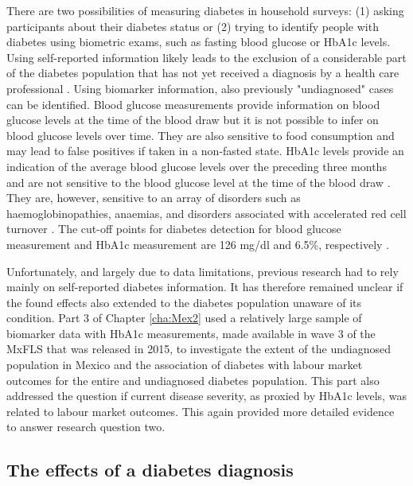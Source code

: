 There are two possibilities of measuring diabetes in household surveys: (1) asking participants about their diabetes status or (2) trying to identify people with diabetes using biometric exams, such as fasting blood glucose or \ac{HbA1c} levels. Using self-reported information likely leads to the exclusion of a considerable part of the diabetes population that has not yet received a diagnosis by a health care professional \parencite{Beagley2014}. Using biomarker information, also previously "undiagnosed" cases can be identified. Blood glucose measurements provide information on blood glucose levels at the time of the blood draw but it is not possible to infer on blood glucose levels over time. They are also sensitive to food consumption and may lead to false positives if taken in a non-fasted state. \ac{HbA1c} levels provide an indication of the average blood glucose levels over the preceding three months and are not sensitive to the blood glucose level at the time of the blood draw \parencite{WorldHealthOrganization2011}. They are, however, sensitive to an array of disorders such as haemoglobinopathies, anaemias, and disorders associated with accelerated red cell turnover \parencite{WorldHealthOrganization2011}. The cut-off points for diabetes detection for blood glucose measurement and \ac{HbA1c} measurement are 126 mg/dl and 6.5\%, respectively \parencite{WorldHealthOrganization2006,WorldHealthOrganization2011}.

Unfortunately, and largely due to data limitations, previous research had to rely mainly on self-reported diabetes information. It has therefore remained unclear if the found effects also extended to the diabetes population unaware of its condition. Part 3 of Chapter \ref{cha:Mex2} used a relatively large sample of biomarker data with \ac{HbA1c} measurements, made available in wave 3 of the \ac{MxFLS} that was released in 2015, to investigate the extent of the undiagnosed population in Mexico and the association of diabetes with labour market outcomes for the entire and undiagnosed diabetes population. This part also addressed the question if current disease severity, as proxied by \ac{HbA1c} levels, was related to labour market outcomes. This again provided more detailed evidence to answer research question two.

\subsection{The effects of a diabetes diagnosis}

